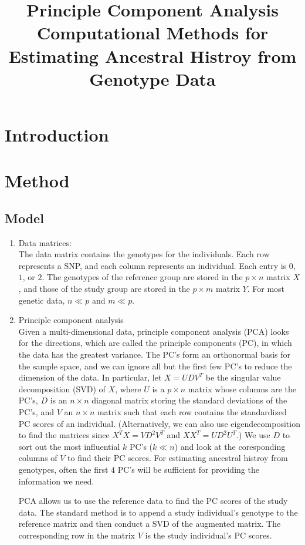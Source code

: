 \documentclass{article}[12pt]
\title{Principle Component Analysis Computational Methods
  for Estimating Ancestral Histroy from Genotype Data}
\begin{document}
\maketitle

\section{Introduction}

\section{Method}

\subsection{Model}

\begin{enumerate}
\item Data matrices:\\
  The data matrix contains the genotypes for the individuals.
  Each row represents a SNP, and each column represents an individual.
  Each entry is $0$, $1$, or $2$.
  The genotypes of the reference group are stored in the $p \times n$ matrix $X$,
  and those of the study group are stored in the $p \times m$ matrix $Y$.
  For most genetic data, $n \ll p$ and $m \ll p$.
\item Principle component analysis \\
  Given a multi-dimensional data, principle component analysis (PCA) looks for the directions, which are called the principle components (PC), in which the data has the greatest variance.
  The PC's form an orthonormal basis for the sample space,
  and we can ignore all but the first few PC's to reduce the dimension of the data.
  In particular, let $X=UDV^T$ be the singular value decomposition (SVD) of $X$,
  where $U$ is a $p \times n$ matrix whose columns are the PC's,
  $D$ is an $n \times n$ diagonal matrix storing the standard deviations of the PC's,
  and $V$ an $n \times n$ matrix such that each row contains the standardized PC scores of an individual.
  (Alternatively, we can also use eigendecomposition to find the matrices since $X^T X = VD^2V^T$ and $X X^T = UD^2U^T$.)
  We use $D$ to sort out the most influential $k$ PC's ($k \ll n$) and look at the coresponding columns of $V$ to find their PC scores.
  For estimating ancestral histroy from genotypes, often the first $4$ PC's will be sufficient for providing the information we need.

  PCA allows us to use the reference data to find the PC scores of the study data.
  The standard method is to append a study individual's genotype to the reference matrix and then conduct a SVD of the augmented matrix.
  The corresponding row in the matrix $V$ is the study individual's PC scores.
\end{enumerate}
\end{document}
